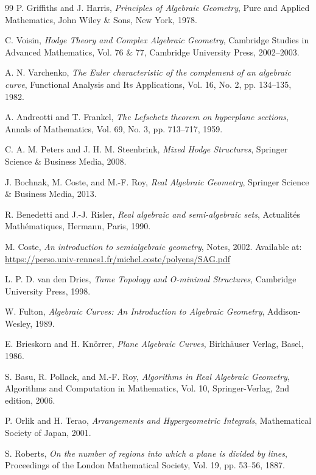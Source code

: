 \documentclass[article,11pt]{amsart} \numberwithin{equation}{section}
\numberwithin{equation}{section}
\begin{document}
{\begin{thebibliography}{99}
	P. Griffiths and J. Harris,
	{\it Principles of Algebraic Geometry},
	Pure and Applied Mathematics, John Wiley \& Sons, New York, 1978.
	
	C. Voisin,
	{\it Hodge Theory and Complex Algebraic Geometry},
	Cambridge Studies in Advanced Mathematics, Vol. 76 \& 77,
	Cambridge University Press, 2002--2003.
	
	A. N. Varchenko,
	{\it The Euler characteristic of the complement of an algebraic curve},
	Functional Analysis and Its Applications, Vol. 16, No. 2, pp. 134--135, 1982.
	
	A. Andreotti and T. Frankel,
	{\it The Lefschetz theorem on hyperplane sections},
	Annals of Mathematics, Vol. 69, No. 3, pp. 713--717, 1959.
	
	C. A. M. Peters and J. H. M. Steenbrink,
	{\it Mixed Hodge Structures},
	Springer Science \& Business Media, 2008.
	
	J. Bochnak, M. Coste, and M.-F. Roy,
	{\it Real Algebraic Geometry},
	Springer Science \& Business Media, 2013.
	
	R. Benedetti and J.-J. Risler,
	{\it Real algebraic and semi-algebraic sets},
	Actualités Mathématiques, Hermann, Paris, 1990.
	
	M. Coste,
	{\it An introduction to semialgebraic geometry},
	Notes, 2002.
	Available at: \url{https://perso.univ-rennes1.fr/michel.coste/polyens/SAG.pdf}
	
	L. P. D. van den Dries,
	{\it Tame Topology and O-minimal Structures},
	Cambridge University Press, 1998.
	
	W. Fulton,
	{\it Algebraic Curves: An Introduction to Algebraic Geometry},
	Addison-Wesley, 1989.
	
	E. Brieskorn and H. Knörrer,
	{\it Plane Algebraic Curves},
	Birkhäuser Verlag, Basel, 1986.
	
	S. Basu, R. Pollack, and M.-F. Roy,
	{\it Algorithms in Real Algebraic Geometry},
	Algorithms and Computation in Mathematics, Vol. 10,
	Springer-Verlag, 2nd edition, 2006.
	
	P. Orlik and H. Terao,
	{\it Arrangements and Hypergeometric Integrals},
	Mathematical Society of Japan, 2001.
	
	S. Roberts,
	{\it On the number of regions into which a plane is divided by lines},
	Proceedings of the London Mathematical Society, Vol. 19, pp. 53--56, 1887.
	

\end{thebibliography}}
\end{document}
